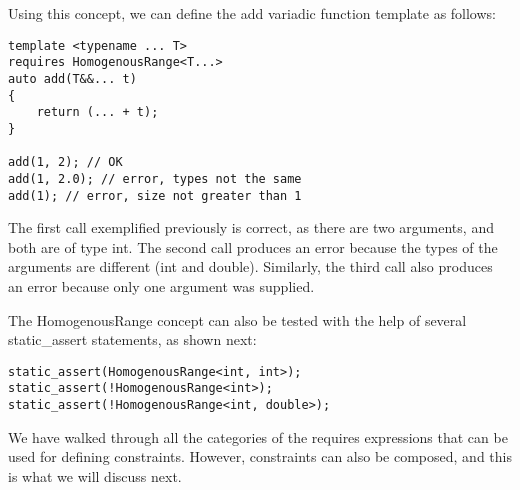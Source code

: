 Using this concept, we can define the add variadic function template as follows:

\begin{lstlisting}[style=styleCXX]
template <typename ... T>
requires HomogenousRange<T...>
auto add(T&&... t)
{
	return (... + t);
}

add(1, 2); // OK
add(1, 2.0); // error, types not the same
add(1); // error, size not greater than 1
\end{lstlisting}

The first call exemplified previously is correct, as there are two arguments, and both are of type int. The second call produces an error because the types of the arguments are different (int and double). Similarly, the third call also produces an error because only one argument was supplied.

The HomogenousRange concept can also be tested with the help of several static\_assert statements, as shown next:

\begin{lstlisting}[style=styleCXX]
static_assert(HomogenousRange<int, int>);
static_assert(!HomogenousRange<int>);
static_assert(!HomogenousRange<int, double>);
\end{lstlisting}

We have walked through all the categories of the requires expressions that can be used for defining constraints. However, constraints can also be composed, and this is what we will discuss next.
















